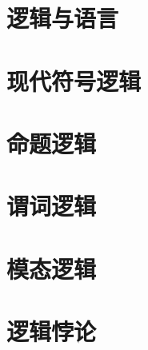 \documentclass[a4paper,11pt,twoside]{book}
\begin{document}
\chapter{逻辑与语言}










\chapter{现代符号逻辑}









\chapter{命题逻辑}





\chapter{谓词逻辑}







\chapter{模态逻辑}




\chapter{逻辑悖论}



\end{document}
